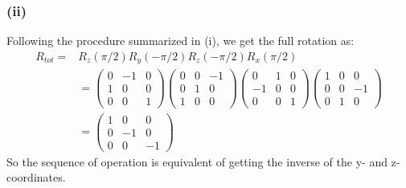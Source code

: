 \documentclass[11pt]{article}
\begin{document}
\subsubsection*{(ii)}
Following the procedure summarized in (i), we get the full rotation as: 
\begin{align}
    R_{tot} = &R_z(\pi/2)R_y(-\pi/2)R_z(-\pi/2)R_x(\pi/2) \\
    & = \begin{pmatrix}0&-1&0\\1&0&0\\0&0&1\end{pmatrix} \begin{pmatrix}0&0&-1\\0&1&0\\1&0&0\end{pmatrix} \begin{pmatrix}0&1&0\\-1&0&0\\0&0&1\end{pmatrix} \begin{pmatrix}1&0&0\\0&0&-1\\0&1&0\end{pmatrix}\\
    & = \begin{pmatrix}1&0&0\\0&-1&0\\0&0&-1\end{pmatrix} 
\end{align}
So the sequence of operation is equivalent of getting the inverse of the y- and z- coordinates. 
\end{document}
